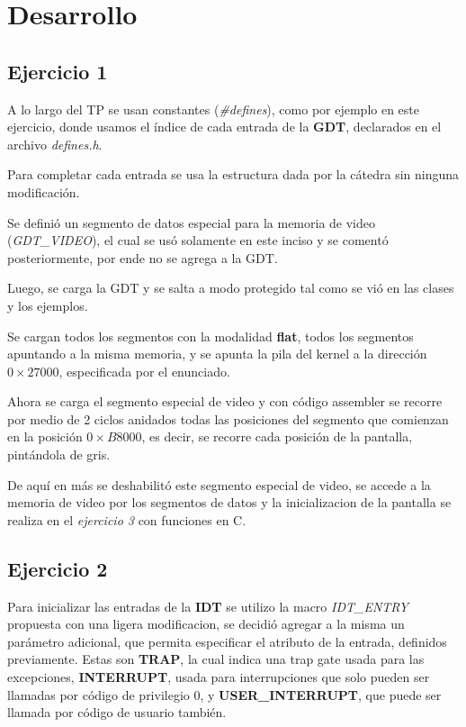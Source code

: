 \section{Desarrollo}

\subsection{Ejercicio 1}

A lo largo del TP se usan constantes ({\it \#defines\/}), como por ejemplo
en este ejercicio, donde usamos el índice de cada entrada de la {\bf GDT}, declarados
en el archivo {\it defines.h\/}.

Para completar cada entrada se usa la estructura dada por la cátedra sin
ninguna modificación.


Se definió un segmento de datos especial para la memoria de video
({\it GDT_VIDEO\/}), el cual se usó solamente en este inciso y se comentó
posteriormente, por ende no se agrega a la GDT.

Luego, se carga la GDT y se salta a modo protegido tal como se vió en las clases
y los ejemplos.

Se cargan todos los segmentos con la modalidad {\bf flat}, todos los segmentos
apuntando a la misma memoria, y se apunta la pila del kernel a la dirección
$0\times27000$, especificada por el enunciado.

Ahora se carga el segmento especial de video y con código assembler se recorre
por medio de 2 ciclos anidados todas las posiciones del segmento que comienzan
en la posición $0\times B8000$, es decir, se recorre cada posición de la
pantalla, pintándola de gris.

De aquí en más se deshabilitó este segmento especial de video, se accede a la
memoria de video por los segmentos de datos y la inicializacion de la pantalla
se realiza en el {\it ejercicio 3\/} con funciones en C.


\subsection{Ejercicio 2}

Para inicializar las entradas de la {\bf IDT} se utilizo la macro {\it IDT_ENTRY\/}
propuesta con una ligera modificacion, se decidió agregar a la misma un
parámetro adicional, que permita especificar el atributo de la entrada,
definidos previamente.
Estas son {\bf TRAP}, la cual indica una trap gate usada para
las excepciones, {\bf INTERRUPT}, usada para interrupciones que solo pueden ser
llamadas por código de privilegio 0, y {\bf USER_INTERRUPT}, que puede ser llamada
por código de usuario también.

